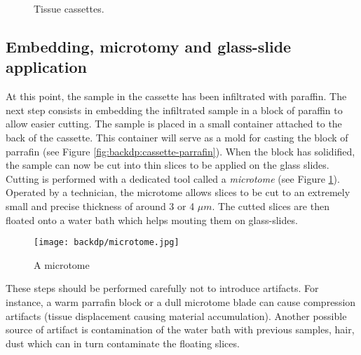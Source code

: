 
\begin{figure}
  \centering
  \quad
  \caption{Tissue cassettes.}
\end{figure}

\subsection{Embedding, microtomy and glass-slide application}
\label{ssec:backdp:embedding}

At this point, the sample in the cassette has been infiltrated with paraffin. The next step consists in embedding the infiltrated sample in a block of paraffin to allow easier cutting. The sample is placed in a small container attached to the back of the cassette. This container will serve as a mold for casting the block of parrafin (see Figure \ref{fig:backdp:cassette-parrafin}). When the block has solidified, the sample can now be cut into thin slices to be applied on the glass slides. Cutting is performed with a dedicated tool called a \textit{microtome} (see Figure \ref{fig:backdp:microtome}). Operated by a technician, the microtome allows slices to be cut to an extremely small and precise thickness of around 3 or 4 $\mu m$. The cutted slices are then floated onto a water bath which helps mouting them on glass-slides. 

\begin{figure}
  \centering
  \texttt{[image: backdp/microtome.jpg]}
  \caption{A microtome}
  \label{fig:backdp:microtome}
\end{figure}

These steps should be performed carefully not to introduce artifacts. For instance, a warm parrafin block or a dull microtome blade can cause compression artifacts (\ie tissue displacement causing material accumulation). Another possible source of artifact is contamination of the water bath with previous samples, hair, dust which can in turn contaminate the floating slices.   

